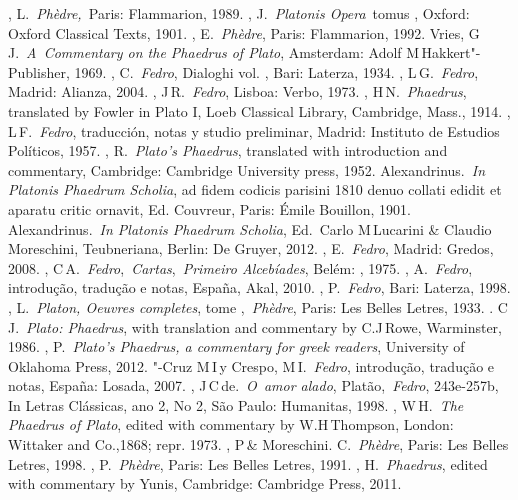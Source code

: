{\begin{bibliohedra}
, L.~\emph{Phèdre,~}Paris: Flammarion, 1989.
, J.~\emph{Platonis Opera}~tomus , Oxford: Oxford Classical
  Texts, 1901.
, E.~\emph{Phèdre}, Paris: Flammarion, 1992.
 Vries, G\,J.~\emph{A~Commentary on the Phaedrus of Plato},
  Amsterdam: Adolf M\,Hakkert"-Publisher, 1969.
, C.~\emph{Fedro}, Dialoghi vol. , Bari: Laterza, 1934.
, L\,G.~\emph{Fedro}, Madrid: Alianza, 2004.
, J\,R.~\emph{Fedro}, Lisboa: Verbo, 1973.
, H\,N.~\emph{Phaedrus}, translated by Fowler in Plato I, Loeb
  Classical Library, Cambridge, Mass., 1914.
, L\,F.~\emph{Fedro}, traducción, notas y studio preliminar,
  Madrid: Instituto de Estudios Políticos, 1957.
, R.~\emph{Plato's Phaedrus}, translated with introduction
  and commentary, Cambridge: Cambridge University press, 1952.
 Alexandrinus.~\emph{In Platonis Phaedrum Scholia}, ad fidem
  codicis parisini 1810 denuo collati edidit et aparatu critic ornavit,
  Ed. Couvreur, Paris: Émile Bouillon, 1901.
 Alexandrinus.~\emph{In Platonis Phaedrum Scholia}, Ed.~Carlo
  M\,Lucarini \& Claudio Moreschini, Teubneriana, Berlin: De Gruyer,
  2012.
, E.~\emph{Fedro}, Madrid: Gredos, 2008.
, C\,A.~\emph{Fedro},~\emph{Cartas},~\emph{Primeiro Alcebíades},
  Belém: , 1975.
, A.~\emph{Fedro}, introdução, tradução e notas, España, Akal,
  2010.
, P.~\emph{Fedro}, Bari: Laterza, 1998.
, L.~\emph{Platon, Oeuvres completes}, tome ,~\emph{Phèdre},
  Paris: Les Belles Letres, 1933.
. C\,J.~\emph{Plato: Phaedrus}, with translation and commentary by
  C.J\,Rowe, Warminster, 1986.
, P.~\emph{Plato's Phaedrus, a commentary for greek readers},
  University of Oklahoma Press, 2012.
"-Cruz M\,I\,y Crespo, M\,I.~\emph{Fedro}, introdução, tradução e
  notas, España: Losada, 2007.
, J\,C\,de.~\emph{O~amor alado}, Platão,~\emph{Fedro}, 243e-257b,
  In Letras Clássicas, ano 2, No 2, São Paulo: Humanitas, 1998.
, W\,H.~\emph{The Phaedrus of Plato}, edited with commentary
  by W.H\,Thompson, London: Wittaker and Co.,1868; repr. 1973.
, P\,\& Moreschini. C.~\emph{Phèdre}, Paris: Les Belles Letres,
  1998.
, P.~\emph{Phèdre}, Paris: Les Belles Letres, 1991.
, H.~\emph{Phaedrus}, edited with commentary by Yunis, Cambridge:
  Cambridge Press, 2011.
\end{bibliohedra}

}
